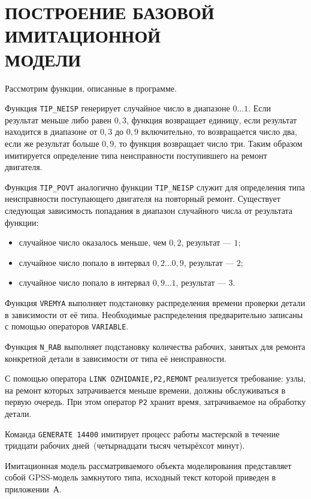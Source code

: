 \section[Построение базовой имитационной модели]
{ПОСТРОЕНИЕ БАЗОВОЙ ИМИТАЦИОННОЙ \\ МОДЕЛИ}

Рассмотрим функции, описанные в программе.

Функция \texttt{TIP\_NEISP} генерирует случайное число в диапазоне $ 0 \dots 1 $.
Если результат меньше либо равен $ 0{,}3 $, функция возвращает единицу,
если результат находится в диапазоне от $ 0{,}3 $ до $ 0{,}9 $ включительно,
то возвращается число два, если же результат больше $ 0{,}9 $, то функция возвращает
число три. Таким образом имитируется определение типа неисправности поступившего
на ремонт двигателя.

Функция \texttt{TIP\_POVT} аналогично функции \texttt{TIP\_NEISP} служит для
определения типа неисправности поступающего двигателя на повторный ремонт. Существует
следующая зависимость попадания в диапазон случайного числа от результата функции:
\begin{itemize}
  \item случайное число оказалось меньше, чем $ 0{,}2 $, результат --- $ 1 $;
  \item случайное число попало в интервал $ 0{,}2 \dots 0{,}9 $, результат --- $ 2 $;
  \item случайное число попало в интервал $ 0{,}9 \dots 1 $, результат --- $ 3 $.
\end{itemize}

Функция \texttt{VREMYA} выполняет подстановку распределения времени проверки
детали в зависимости от её типа. Необходимые распределения предварительно
записаны с помощью операторов \texttt{VARIABLE}.

Функция \texttt{N\_RAB} выполняет подстановку количества рабочих, занятых
для ремонта конкретной детали в зависимости от типа её неисправности.

С помощью оператора \texttt{LINK OZHIDANIE,P2,REMONT} реализуется требование:
узлы, на ремонт которых затрачивается меньше времени, должны обслуживаться в первую
очередь. При этом оператор \texttt{P2} хранит время, затрачиваемое
на обработку детали.

Команда \texttt{GENERATE 14400} имитирует процесс работы мастерской в течение тридцати
рабочих дней~(четырнадцати тысяч четырёхсот минут).

Имитационная модель рассматриваемого объекта моделирования представляет
собой GPSS-модель замкнутого типа, исходный текст которой приведен в приложении~А.

\pagebreak
